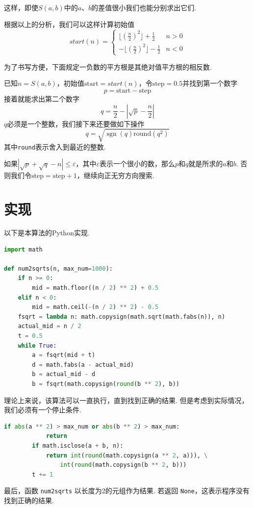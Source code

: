 \documentclass[a4paper, UTF8]{ctexart}
\DeclareMathOperator{\sgn}{\mathrm{sgn}}
\begin{document}
这样，即使$S(a,b)$中的$a$、$b$的差值很小我们也能分别求出它们.

根据以上的分析，我们可以这样计算初始值
\[
    start(n)=
    \begin{cases}
        \lfloor(\frac{n}{2})^2\rfloor+\frac{1}{2}  &n>0 \\
        -\lfloor(\frac{n}{2})^2\rfloor-\frac{1}{2} &n<0
    \end{cases}
\]

为了书写方便，下面规定一负数的平方根是其绝对值平方根的相反数.

已知$n=S(a,b)$，初始值$\text{start}=start(n)$，令$\text{step}=0.5$并找到第一个数字\[p=\text{start}-\text{step}\]接着就能求出第二个数字\[q=\frac{n}{2}-|\sqrt{p}-\frac{n}{2}|\]$q$必须是一个整数，我们接下来还要做如下操作\[q=\sqrt{\sgn(q)\mathrm{round}(q^2)}\]其中\verb|round|表示舍入到最近的整数.

如果$|\sqrt{p}+\sqrt{q}-n|\leq\varepsilon$，其中$\varepsilon$表示一个很小的数，那么$p$和$q$就是所求的$a$和$b$. 否则我们令$\text{step}=\text{step}+1$，继续向正无穷方向搜索.

\section{实现}
以下是本算法的Python实现.

\begin{lstlisting}[language=python, name=example1]
import math

def num2sqrts(n, max_num=1000):
    if n >= 0:
        mid = math.floor((n / 2) ** 2) + 0.5
    elif n < 0:
        mid = math.ceil(-(n / 2) ** 2) - 0.5
    fsqrt = lambda n: math.copysign(math.sqrt(math.fabs(n)), n)
    actual_mid = n / 2
    t = 0.5
    while True:
        a = fsqrt(mid + t)
        d = math.fabs(a - actual_mid)
        b = actual_mid - d
        b = fsqrt(math.copysign(round(b ** 2), b))
\end{lstlisting}
理论上来说，该算法可以一直执行，直到找到正确的结果. 但是考虑到实际情况，我们必须有一个停止条件.
\begin{lstlisting}[language=python, name=example1]
        if abs(a ** 2) > max_num or abs(b ** 2) > max_num:
            return
        if math.isclose(a + b, n):
            return int(round(math.copysign(a ** 2, a))), \
                int(round(math.copysign(b ** 2, b)))
        t += 1
\end{lstlisting}
最后，函数 \verb|num2sqrts| 以长度为2的元组作为结果. 若返回 \verb|None|，这表示程序没有找到正确的结果.
\end{document}
